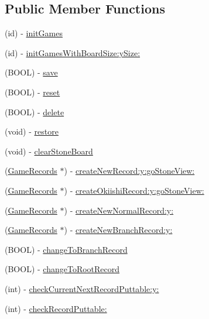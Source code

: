 \subsection*{Public Member Functions}
\begin{DoxyCompactItemize}
\item 
(id) -\/ \hyperlink{interface_games_a01dfe628966c04670fedf35e02c33371}{initGames}
\item 
(id) -\/ \hyperlink{interface_games_a430dea682d0d84b969200dd97dd2be98}{initGamesWithBoardSize:ySize:}
\item 
(BOOL) -\/ \hyperlink{interface_games_ae1b6c93bf7add9a10162247a20065ae8}{save}
\item 
(BOOL) -\/ \hyperlink{interface_games_aca0584d71aeaf9cb5d3f0ee24e69fe24}{reset}
\item 
(BOOL) -\/ \hyperlink{interface_games_af8332c38140082709ec41bf91747c41f}{delete}
\item 
(void) -\/ \hyperlink{interface_games_a4c5e2dc4e111e48f56ecb8e94fb3cac1}{restore}
\item 
(void) -\/ \hyperlink{interface_games_ac3127f644ef9d8a28e87606f3d3dfabd}{clearStoneBoard}
\item 
(\hyperlink{interface_game_records}{GameRecords} $\ast$) -\/ \hyperlink{interface_games_a1e4f77c7b6ea0101b16762c8621d861b}{createNewRecord:y:goStoneView:}
\item 
(\hyperlink{interface_game_records}{GameRecords} $\ast$) -\/ \hyperlink{interface_games_a7f86f6e3eca9aba652ae5753f24e38a8}{createOkiishiRecord:y:goStoneView:}
\item 
(\hyperlink{interface_game_records}{GameRecords} $\ast$) -\/ \hyperlink{interface_games_a60cb93e4d2051fa276a8d0504c65bed9}{createNewNormalRecord:y:}
\item 
(\hyperlink{interface_game_records}{GameRecords} $\ast$) -\/ \hyperlink{interface_games_a079f26e20d4f1be8525166822b63c0c8}{createNewBranchRecord:y:}
\item 
(BOOL) -\/ \hyperlink{interface_games_ae4fe69c9a21bec384055e089ceac2829}{changeToBranchRecord}
\item 
(BOOL) -\/ \hyperlink{interface_games_a08cf984bc98da86cfd1d1fefa4dbfda8}{changeToRootRecord}
\item 
(int) -\/ \hyperlink{interface_games_a3fb19a273e3591f2e8e61a9eee23d84c}{checkCurrentNextRecordPuttable:y:}
\item 
(int) -\/ \hyperlink{interface_games_a6ebac07fc8659bbb8af5a5bc1201256f}{checkRecordPuttable:}
\item 

\end{DoxyCompactItemize}
